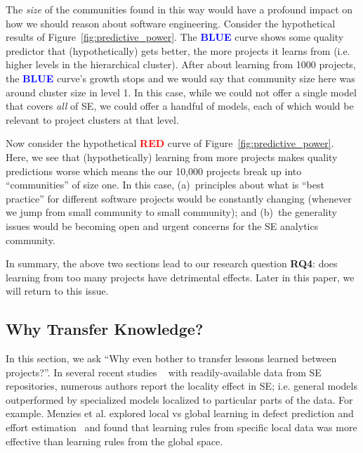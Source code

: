\documentclass[10pt,journal,compsoc]{IEEEtran}
\begin{document}
The {\em size} of the communities found in this way would have a profound impact on how we should reason about software engineering. Consider the hypothetical results of Figure~\ref{fig:predictive_power}. The \textcolor{blue}{{\bf BLUE}} curve shows some quality predictor that (hypothetically) gets better, the more projects it learns from (i.e. higher levels in the hierarchical cluster). After about learning from 1000 projects, the \textcolor{blue}{{\bf BLUE}} curve's growth stops and we would say that community size here was around cluster size in level 1. In this case, while we could not offer a single model that covers {\em all} of SE, we could offer a handful of models, each of which would be relevant to project clusters at that level. 

Now consider the hypothetical \textcolor{red}{{\bf RED}} curve of Figure~\ref{fig:predictive_power}. Here, we see that (hypothetically)  learning from more projects makes quality predictions worse which means the our 10,000 projects break up into ``communities'' of size one. In this case,  (a)~principles about what is ``best practice'' for different software projects would be constantly changing (whenever we jump from small community to small community); and (b)~the generality issues would be becoming open and urgent concerns for the SE analytics community.

In summary, the above two sections lead to our  research question {\bf  RQ4}:
does learning from too many projects have detrimental effects. Later in this
paper, we will return to this issue.

\subsection{Why Transfer Knowledge?}
\label{sec:related}

In this section, we ask ``Why even bother to transfer lessons learned between projects?''. In several recent studies ~\cite{bettenburg2012think, menzies2012local, posnett2011ecological} with readily-available data from SE repositories, numerous authors report the locality effect in SE; i.e. general models outperformed by specialized models localized to particular parts of the data.
For example.
Menzies et al. explored local vs global learning in defect prediction and effort estimation~\cite{menzies2012local}  and found that
 learning rules from specific local data was more
 effective than learning rules from the global space.
 
\end{document}
